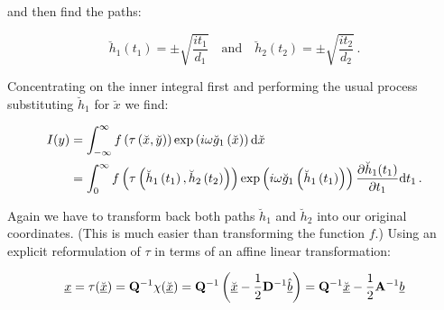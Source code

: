 \documentclass[a4paper,10pt]{article}
\begin{document}
and then find the paths:

\begin{equation}
 \breve{h}_1\left(t_1\right) = \pm \sqrt{\frac{i t_1}{d_{1}}}
 \quad \mathrm{and} \quad
 \breve{h}_2\left(t_2\right) = \pm \sqrt{\frac{i t_2}{d_{2}}} \,.
\end{equation}

Concentrating on the inner integral first and performing the
usual process substituting $\breve{h}_1$ for $\breve{x}$ we
find:


\begin{equation}
\begin{split}
 I(y) & = \int_{-\infty}^{\infty}
           f\left(\tau\left(\breve{x}, \breve{y}\right)\right)
           \exp\left(i \omega \breve{g}_1\left(\breve{x}\right)\right)
          \mathrm{d}\breve{x} \\
      & =  \int_0^{\infty}
           f\left(\tau\left(
             \breve{h}_1\left(t_1\right),
             \breve{h}_2\left(t_2\right)
           \right)\right)
           \exp\left(i \omega \breve{g}_1\left(
             \breve{h}_1\left(t_1\right)
           \right)\right)
           \frac{\partial \breve{h}_1(t_1)}{\partial t_1}
          \mathrm{d}t_1 \,.
\end{split}
\end{equation}

Again we have to transform back both paths $\breve{h}_1$ and $\breve{h}_2$
into our original coordinates. (This is much easier than transforming the
function $f$.) Using an explicit reformulation of $\tau$ in terms of an
affine linear transformation:

\begin{equation}
 \underline{x} = \tau(\breve{\underline{x}})
         = \mathbf{Q}{}^{-1} \chi(\breve{\underline{x}})
         = \mathbf{Q}{}^{-1} \left(\breve{\underline{x}} - \frac{1}{2}\mathbf{D}{}^{-1} \underline{\hat{b}}\right)
         = \mathbf{Q}{}^{-1} \breve{\underline{x}} - \frac{1}{2}\mathbf{A}{}^{-1} \underline{b}
\end{equation}
\end{document}
